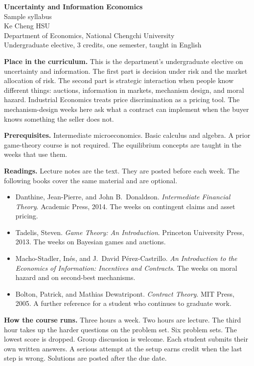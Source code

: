 \documentclass[11pt]{article}
\begin{document}
\begin{center}
{\Large\bfseries Uncertainty and Information Economics}\\[0.3em]
Sample syllabus\\[0.15em]
Ke Cheng HSU\\
Department of Economics, National Chengchi University\\
Undergraduate elective, 3 credits, one semester, taught in English
\end{center}

\textbf{Place in the curriculum.}
This is the department's undergraduate elective on uncertainty and information. The first part is decision under risk and the market allocation of risk. The second part is strategic interaction when people know different things: auctions, information in markets, mechanism design, and moral hazard. Industrial Economics treats price discrimination as a pricing tool. The mechanism-design weeks here ask what a contract can implement when the buyer knows something the seller does not.

\textbf{Prerequisites.}
Intermediate microeconomics. Basic calculus and algebra. A prior game-theory course is not required. The equilibrium concepts are taught in the weeks that use them.

\textbf{Readings.}
Lecture notes are the text. They are posted before each week. The following books cover the same material and are optional.

\begin{itemize}
\item Danthine, Jean-Pierre, and John B.\ Donaldson. \emph{Intermediate Financial Theory}. Academic Press, 2014. The weeks on contingent claims and asset pricing.
\item Tadelis, Steven. \emph{Game Theory: An Introduction}. Princeton University Press, 2013. The weeks on Bayesian games and auctions.
\item Macho-Stadler, In\'es, and J.\ David P\'erez-Castrillo. \emph{An Introduction to the Economics of Information: Incentives and Contracts}. The weeks on moral hazard and on second-best mechanisms.
\item Bolton, Patrick, and Mathias Dewatripont. \emph{Contract Theory}. MIT Press, 2005. A further reference for a student who continues to graduate work.
\end{itemize}

\textbf{How the course runs.}
Three hours a week. Two hours are lecture. The third hour takes up the harder questions on the problem set. Six problem sets. The lowest score is dropped. Group discussion is welcome. Each student submits their own written answers. A serious attempt at the setup earns credit when the last step is wrong. Solutions are posted after the due date.
\end{document}
